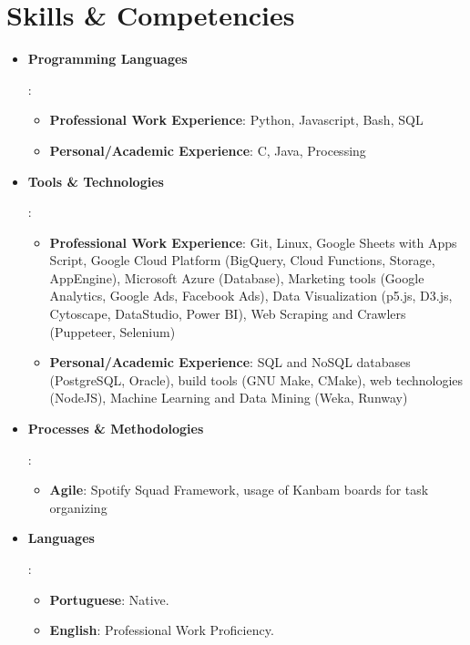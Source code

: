 \documentclass[letterpaper,11pt]{article}
\newcommand{\resumeItem}[2]{
  \item\small{
    \textbf{#1}{: #2 \vspace{-2pt}}
  }
}
\newcommand{\resumeItemListStart}{\begin{itemize}[leftmargin=*]}
\newcommand{\resumeItemListEnd}{\end{itemize}\vspace{-5pt}}
\begin{document}
\section{Skills \& Competencies}
 \resumeItemListStart
    \resumeItem{Programming Languages}{
        \resumeItemListStart
            \resumeItem{Professional Work Experience}{Python, Javascript, Bash, SQL}
            \resumeItem{Personal/Academic Experience}{C, Java, Processing}
        \resumeItemListEnd
    }
    \resumeItem{Tools \& Technologies}{
        \resumeItemListStart
            \resumeItem{Professional Work Experience}{Git, Linux, Google Sheets with Apps Script, Google Cloud Platform (BigQuery, Cloud Functions, Storage, AppEngine), Microsoft Azure (Database), Marketing tools (Google Analytics, Google Ads, Facebook Ads), Data Visualization (p5.js, D3.js, Cytoscape, DataStudio, Power BI), Web Scraping and Crawlers (Puppeteer, Selenium)}
            \resumeItem{Personal/Academic Experience}{SQL and NoSQL databases (PostgreSQL, Oracle), build tools (GNU Make, CMake), web technologies (NodeJS), Machine Learning and Data Mining (Weka, Runway)}
        \resumeItemListEnd
    }
    \resumeItem{Processes \& Methodologies}{
        \resumeItemListStart
            \resumeItem{Agile}{Spotify Squad Framework, usage of Kanbam boards for task organizing}
        \resumeItemListEnd
    }
    \resumeItem{Languages}{
        \resumeItemListStart
            \resumeItem{Portuguese}{Native.}
            \resumeItem{English}{Professional Work Proficiency.}
        \resumeItemListEnd
    }
 \resumeItemListEnd

\end{document}
